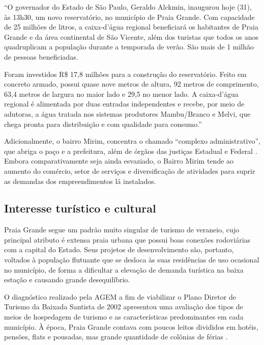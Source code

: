	\begin{citacao}
		``O governador do Estado de São Paulo, Geraldo Alckmin, inaugurou hoje (31), às 13h30, um novo reservatório, no município de Praia Grande. Com capacidade de 25 milhões de litros, a caixa-d'água regional beneficiará os habitantes de Praia Grande e da área continental de São Vicente, além dos turistas que todos os anos quadruplicam a população durante a temporada de verão. São mais de 1 milhão de pessoas beneficiadas.
		
		Foram investidos R\$ 17,8 milhões para a construção do reservatório. Feito em concreto armado, possui quase nove metros de altura, 92 metros de comprimento, 63,4 metros de largura no maior lado e 29,5 no menor lado. A caixa-d'água regional é alimentada por duas entradas independentes e recebe, por meio de adutoras, a água tratada nos sistemas produtores Mambu/Branco e Melvi, que chega pronta para distribuição e com qualidade para consumo.'' \cite{Sabesp2017b}
	\end{citacao}
	
	Adicionalmente, o bairro Mirim, concentra o chamado ``complexo administrativo'', que abriga o paço e a prefeitura, além de órgãos das justiças Estadual e Federal \cite{pmpg2014b}. Embora comparativamente seja ainda esvaziado, o Bairro Mirim tende ao aumento do comércio, setor de serviços e diversificação de atividades para suprir as demandas dos empreendimentos lá instalados.
	
	\subsection{Interesse turístico e cultural}
	
	Praia Grande segue um padrão muito singular de turismo de veraneio, cujo principal atributo é extensa praia urbana que possui boas conexões rodoviárias com a capital do Estado. Seus projetos de desenvolvimento são, portanto, voltados à população flutuante que se desloca às suas residências de uso ocasional no município, de forma a dificultar a elevação de demanda turística na baixa estação e causando grande desequilíbrio. 
	
	O diagnóstico realizado pela AGEM a fim de viabilizar o Plano Diretor de Turismo da Baixada Santista de 2002 apresentou uma avaliação dos tipos de meios de hospedagem de turismo e as características predominantes em cada município. À época, Praia Grande contava com poucos leitos divididos em hotéis, pensões, flats e pousadas, mas grande quantidade de colônias de férias \cite[p.109]{agem2002a}.
	
